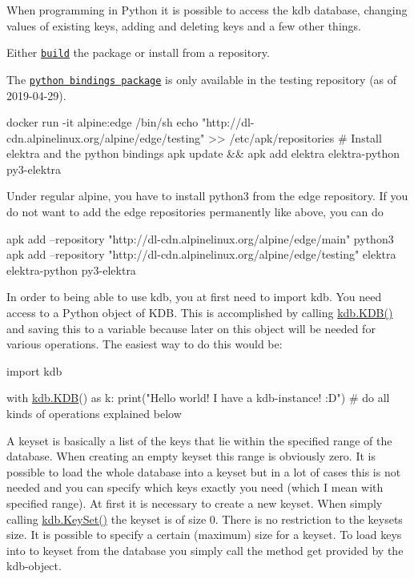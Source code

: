 When programming in Python it is possible to access the kdb database, changing values of existing keys, adding and deleting keys and a few other things.

Either \href{https://www.libelektra.org/bindings/swig_python}{\tt build} the package or install from a repository.

The \href{https://pkgs.alpinelinux.org/packages?name=py3-elektra&branch=edge&repo=testing}{\tt python bindings package} is only available in the testing repository (as of 2019-\/04-\/29).


\begin{DoxyCode}
docker run -it alpine:edge /bin/sh
echo "http://dl-cdn.alpinelinux.org/alpine/edge/testing" >> /etc/apk/repositories
# Install elektra and the python bindings
apk update && apk add elektra elektra-python py3-elektra
\end{DoxyCode}


Under regular alpine, you have to install python3 from the edge repository. If you do not want to add the edge repositories permanently like above, you can do


\begin{DoxyCode}
apk add --repository "http://dl-cdn.alpinelinux.org/alpine/edge/main" python3
apk add --repository "http://dl-cdn.alpinelinux.org/alpine/edge/testing" elektra elektra-python py3-elektra
\end{DoxyCode}


In order to being able to use {\ttfamily kdb}, you at first need to {\ttfamily import kdb}. You need access to a Python object of {\ttfamily K\+DB}. This is accomplished by calling {\ttfamily \hyperlink{classkdb_1_1KDB}{kdb.\+K\+D\+B()}} and saving this to a variable because later on this object will be needed for various operations. The easiest way to do this would be\+:


\begin{DoxyCode}
\textcolor{keyword}{import} kdb

with \hyperlink{classkdb_1_1KDB}{kdb.KDB}() \textcolor{keyword}{as} k:
    print(\textcolor{stringliteral}{"Hello world! I have a kdb-instance! :D"})
    \textcolor{comment}{# do all kinds of operations explained below}
\end{DoxyCode}


A keyset is basically a list of the keys that lie within the specified range of the database. When creating an empty keyset this range is obviously zero. It is possible to load the whole database into a keyset but in a lot of cases this is not needed and you can specify which keys exactly you need (which I mean with specified range). At first it is necessary to create a new keyset. When simply calling {\ttfamily \hyperlink{classkdb_1_1KeySet}{kdb.\+Key\+Set()}} the keyset is of size 0. There is no restriction to the keyset\textquotesingle{}s size. It is possible to specify a certain (maximum) size for a keyset. To load keys into to keyset from the database you simply call the method {\ttfamily get} provided by the kdb-\/object.


